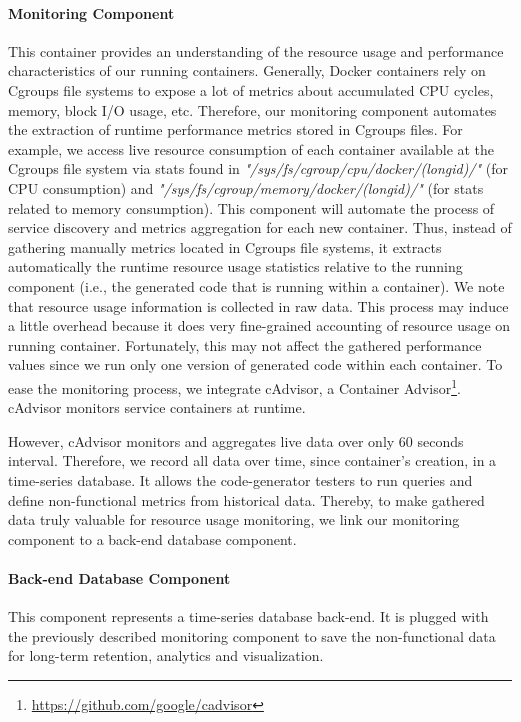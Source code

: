 \paragraph{Monitoring Component}
This container provides an understanding of the resource usage and performance characteristics of our running containers. Generally, Docker containers rely on Cgroups file systems to expose a lot of metrics about accumulated CPU cycles, memory, block I/O usage, etc. Therefore, our monitoring component automates the extraction of runtime performance metrics stored in Cgroups files. For example, we access live resource consumption of each container available at the Cgroups file system via stats found in \textit{"/sys/fs/cgroup/cpu/docker/(longid)/"} (for CPU consumption) and \textit{"/sys/fs/cgroup/memory/docker/(longid)/"} (for stats related to memory consumption). This component will automate the process of service discovery and metrics aggregation for each new container. Thus, instead of gathering manually metrics located in Cgroups file systems, it extracts automatically the runtime resource usage statistics relative to the running component (i.e., the generated code that is running within a container). We note that resource usage information is collected in raw data. This process may induce a little overhead because it does  very fine-grained accounting of resource usage on running container. Fortunately, this may not affect the gathered performance values since we run only one version of generated code within each container.
To ease the monitoring process, we integrate cAdvisor, a Container Advisor\footnote{\url{https://github.com/google/cadvisor}}. cAdvisor monitors service containers at runtime. 

However, cAdvisor monitors and aggregates live data over only 60 seconds interval. Therefore, we record all data over time, since container's creation, in a time-series database. It allows the code-generator testers to run queries and define non-functional metrics from historical data. Thereby, to make gathered data truly valuable for resource usage monitoring, we link our monitoring component to a back-end database component. 



\paragraph{Back-end Database Component}
This component represents a time-series database back-end. It is plugged with the previously described monitoring component to save the non-functional data for long-term retention, analytics and visualization. 

